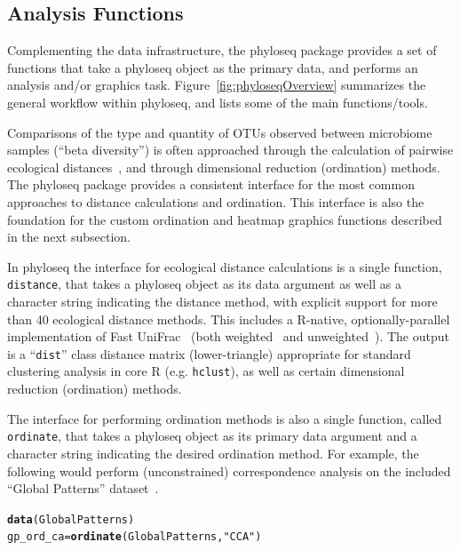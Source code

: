 \documentclass[10pt]{article}\usepackage{graphicx, color}
\makeatletter
\newcommand{\hlfunctioncall}[1]{\textcolor[rgb]{0,0,0}{\textbf{#1}}}%
\newcommand{\hlstring}[1]{\textcolor[rgb]{0,0,0}{#1}}%
\newenvironment{kframe}{%
 \def\at@end@of@kframe{}%
 \ifinner\ifhmode%
  \def\at@end@of@kframe{\end{minipage}}%
  \begin{minipage}{\columnwidth}%
 \fi\fi%
 \def\FrameCommand##1{\hskip\@totalleftmargin \hskip-\fboxsep
 \colorbox{shadecolor}{##1}\hskip-\fboxsep
     \hskip-\linewidth \hskip-\@totalleftmargin \hskip\columnwidth}%
 \MakeFramed {\advance\hsize-\width
   \@totalleftmargin\z@ \linewidth\hsize
   \@setminipage}}%
 {\par\unskip\endMakeFramed%
 \at@end@of@kframe}
\newenvironment{knitrout}{}{} %
\newcommand{\R}{{\textsf{R}}}
\newcommand{\code}[1]{{\texttt{#1}}}
\makeatother
\begin{document}
\subsection*{Analysis Functions}
Complementing the data infrastructure,
the phyloseq package provides a set of functions
that take a phyloseq object as the primary data,
and performs an analysis and/or graphics task.
Figure~\ref{fig:phyloseqOverview} summarizes
the general workflow within phyloseq,
and lists some of the main functions/tools.

Comparisons of the type and quantity of
OTUs observed between microbiome samples (``beta diversity'')
is often approached through the calculation of
pairwise ecological distances~\cite{Faith:1987wx,Anderson:2006fs},
and through dimensional reduction (ordination) methods.
The phyloseq package provides a consistent interface
for the most common approaches to
distance calculations and ordination.
This interface is also the foundation for
the custom ordination and heatmap graphics functions
described in the next subsection.

In phyloseq the interface for ecological distance calculations is
a single function, \code{distance}, 
that takes a phyloseq object as its data argument
as well as a character string indicating the distance method, 
with explicit support for more than 40 ecological distance methods.
This includes a \R{}-native, optionally-parallel implementation
of Fast UniFrac~\cite{Hamady:2009}
(both weighted~\cite{Lozupone:2007kg} and unweighted~\cite{Lozupone:2005unifrac}). 
The output is a ``\code{dist}'' class distance matrix (lower-triangle)
appropriate for standard clustering analysis in core \R{} (e.g. \code{hclust}),
as well as certain dimensional reduction (ordination) methods. 

The interface for performing ordination methods is also a single function,
called \code{ordinate}, 
that takes a phyloseq object as its primary data argument
and a character string indicating the desired ordination method. 
For example, the following would perform
(unconstrained) correspondence analysis on
the included ``Global Patterns'' dataset~\cite{globalpatterns}.
\begin{knitrout}
\color{fgcolor}\begin{kframe}
\begin{alltt}
\hlfunctioncall{data}(GlobalPatterns)
gp_ord_ca = \hlfunctioncall{ordinate}(GlobalPatterns, \hlstring{"CCA"})
\end{alltt}
\end{kframe}
\end{knitrout}
\end{document}

